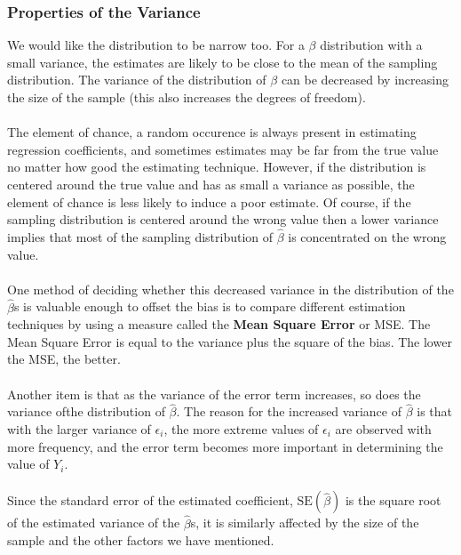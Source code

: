 \documentclass[11pt]{article}
\begin{document}
\subsubsection{Properties of the Variance}
We would like the distribution to be narrow too. For a $\beta$ distribution with a small variance, the estimates are likely to be close to the mean of the sampling distribution. The variance of the distribution of $\beta$ can be decreased by increasing the size of the sample (this also increases the degrees of freedom).\\ \\
The element of chance, a random occurence is always present in estimating regression coefficients, and sometimes estimates may be far from the true value no matter how good the estimating technique. However, if the distribution is centered around the true value and has as small a variance as possible, the element of chance is less likely to induce a poor estimate. Of course, if the sampling distribution is centered around the wrong value then a lower variance implies that most of the sampling distribution of $\hat{\beta}$ is concentrated on the wrong value.\\ \\
One method of deciding whether this decreased variance in the distribution of the $\hat{\beta}$s is valuable enough to offset the bias is to compare different estimation techniques by using a measure called the \textbf{Mean Square Error} or MSE. The Mean Square Error  is equal to the variance plus the square of the bias. The lower the MSE, the better.\\ \\
Another item is that as the variance of the error term increases, so does the variance ofthe distribution of $\hat{\beta}$. The reason for the increased variance of $\hat{\beta}$ is that with the larger variance of  $\epsilon_i$, the more extreme values of $\epsilon_i$ are observed with more frequency, and the error term becomes more important in determining the value of $Y_i$.\\ \\
Since the standard error of the estimated coefficient, $\text{SE}(\hat{\beta})$ is the square root of the estimated variance of the $\hat{\beta}$s, it is similarly affected by the size of the sample and the other factors we have mentioned.
\end{document}
